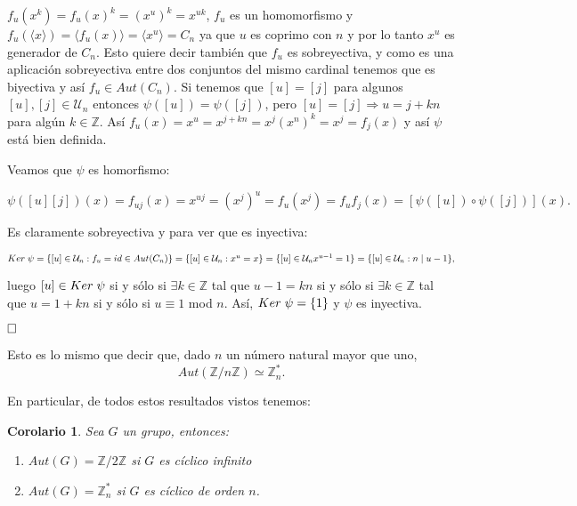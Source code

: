 \documentclass[12pt]{article}
\newtheorem{corolario}{Corolario}[theorem]
\begin{document}
$f_{u}(x^{k})=f_{u}(x)^{k}=(x^{u})^{k}=x^{uk}$, $f_{u}$ es un homomorfismo y $f_{u}(\langle x \rangle )= \langle f_{u}(x) \rangle = \langle x^{u} \rangle = C_{n}$ ya que $u$ es coprimo con $n$ y por lo tanto  $x^{u}$ es generador de $C_{n}$. Esto quiere decir también que $f_{u}$ es sobreyectiva, y como es una aplicación sobreyectiva entre dos conjuntos del mismo cardinal tenemos que es biyectiva y así $f_{u} \in Aut(C_{n})$. Si tenemos que $[u]=[j]$ para algunos $[u],[j] \in \mathcal{U}_{n}$ entonces $\psi([u]) = \psi ([j])$, pero $[u]=[j] \Rightarrow u=j+kn$ para algún $k \in \mathbb{Z}$. Así $f_{u}(x)=x^{u}=x^{j+kn}=x^{j}(x^{n})^{k}=x^{j}=f_{j}(x)$ y así $\psi$ está bien definida.

Veamos que $\psi$ es homorfismo: 

$\psi([u][j])(x)=f_{uj}(x)=x^{uj}=(x^{j})^{u}=f_{u}(x^{j})=f_{u}f_{j}(x)=[\psi([u]) \circ \psi([j])](x).$

Es claramente sobreyectiva y para ver que es inyectiva: 

\begin{center}$Ker \hspace{0.1cm} \psi=\lbrace [u] \in \mathcal{U}_{n}:f_{u}=id \in Aut(C_{n}) \rbrace = \lbrace [u] \in \mathcal{U}_{n}:x^{u}=x \rbrace = \lbrace [u] \in \mathcal{U}_{n} x^{u-1}=1 \rbrace = \lbrace [u] \in \mathcal{U}_{n}: n \mid u-1 \rbrace,$\end{center}
luego $[u] \in Ker \hspace{0.1cm} \psi$ si y sólo si $\exists k \in \mathbb{Z}$ tal que $u-1 =kn$ si y sólo si $\exists k \in \mathbb{Z}$ tal que $u = 1+kn$ si y sólo si $u \equiv 1$ mod $n$. Así, $Ker \hspace{0.1cm} \psi =\lbrace 1 \rbrace$ y $\psi$ es inyectiva.

$\hfill \square$

Esto es lo mismo que decir que, dado $n$ un número natural mayor que uno, $$Aut(\mathbb{Z}/n\mathbb{Z}) \simeq \mathbb{Z}_{n}^{\ast}.$$

En particular, de todos estos resultados vistos tenemos:

\begin{corolario} \label{eq:AutUnidads} Sea $G$ un grupo, entonces:
\begin{enumerate}
\item $Aut(G) = \mathbb{Z}/2\mathbb{Z}$ si $G$ es cíclico infinito
\item $Aut(G) = \mathbb{Z}_{n}^{\ast}$ si $G$ es cíclico de orden $n$.
\end{enumerate}
\end{corolario}
\end{document}

